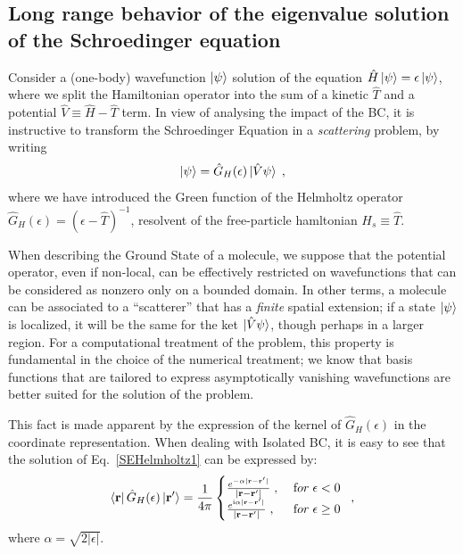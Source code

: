 \documentclass[reprint,aps,prb]{revtex4-1}
\renewcommand{\r}{{\bf r}}
\newcommand{\eps}{\epsilon}
\newcommand{\ii}{\mathrm{i}}
\newcommand{\be}{\begin{equation}}
\newcommand{\ee}{\end{equation}}
\newcommand{\lb}{\label}
\newcommand{\op}[1]{\hat {#1}}
\begin{document}
\subsection{Long range behavior of the eigenvalue solution of the Schroedinger equation}
\label{SEopenSystem}
Consider a (one-body) wavefunction $\ket{\psi}$ solution of the equation
$\op H\ket{\psi}=\eps\ket{\psi}$, where we split the Hamiltonian operator into the sum of
a kinetic $\op T$ and a potential $\op V \equiv \op H - \op T$ term.
In view of analysing the impact of the BC, it is instructive to transform 
the Schroedinger Equation in a \emph{scattering} problem, by writing
\be\lb{SEHelmholtz1}
\ket{\psi} = \op G_H(\eps)\ket{\op V\psi}\;,
\ee
where we have introduced the Green function of the Helmholtz operator $\op G_H(\eps) = (\eps-\op T)^{-1}$,
resolvent of the free-particle hamltonian $H_s \equiv \op T$.

When describing the Ground State of a molecule, we suppose that the potential operator, even if non-local,
can be effectively restricted on wavefunctions that can be considered as nonzero only on a
bounded domain. In other terms, a molecule can be associated to a ``scatterer'' that has a \emph{finite} 
spatial extension; if a state $\ket{\psi}$ is localized, it will be the same for the ket $\ket{\op V \psi}$, though 
perhaps in a larger region.
For a computational treatment of the problem, this property is fundamental in the 
choice of the numerical treatment; we know that basis functions that are tailored to express asymptotically vanishing 
wavefunctions are better suited for the solution of the problem.

This fact is made apparent by the expression of 
the kernel of $\op G_H(\eps)$ in the coordinate representation. 
When dealing with Isolated BC, it is easy to see that the solution of Eq.~\eqref{SEHelmholtz1}
can be expressed by:
\be\lb{HelmholtzKernelDef1}
\bra{\r} \op G_H(\eps) \ket{\r'} = \frac{1}{4\pi} \begin{cases}
\frac{e^{-\alpha|\r - \r' |}}{|\r- \r' |} \;,\; & {\textrm for}\; \eps  < 0\; \\ 
\frac{e^{\ii \alpha |\r-\r' |}}{|\r-\r' |} \;, & {\textrm for} \; \eps \geq 0
\end{cases} \;,
\ee
where $\alpha = \sqrt{2|\eps|}$. 
\end{document}

